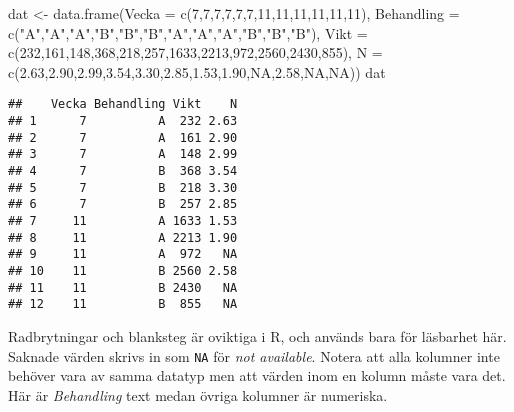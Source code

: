 \documentclass[
]{book}
\newenvironment{Shaded}{\begin{snugshade}}{\end{snugshade}}
\newcommand{\AttributeTok}[1]{\textcolor[rgb]{0.77,0.63,0.00}{#1}}
\newcommand{\ConstantTok}[1]{\textcolor[rgb]{0.00,0.00,0.00}{#1}}
\newcommand{\DecValTok}[1]{\textcolor[rgb]{0.00,0.00,0.81}{#1}}
\newcommand{\FloatTok}[1]{\textcolor[rgb]{0.00,0.00,0.81}{#1}}
\newcommand{\FunctionTok}[1]{\textcolor[rgb]{0.00,0.00,0.00}{#1}}
\newcommand{\NormalTok}[1]{#1}
\newcommand{\OtherTok}[1]{\textcolor[rgb]{0.56,0.35,0.01}{#1}}
\newcommand{\StringTok}[1]{\textcolor[rgb]{0.31,0.60,0.02}{#1}}
\theoremstyle{definition}
\theoremstyle{definition}
\theoremstyle{definition}
\theoremstyle{definition}
\theoremstyle{remark}
\begin{document}
\begin{Shaded}
\begin{Highlighting}[]
\NormalTok{dat }\OtherTok{\textless{}{-}} \FunctionTok{data.frame}\NormalTok{(}\AttributeTok{Vecka =} \FunctionTok{c}\NormalTok{(}\DecValTok{7}\NormalTok{,}\DecValTok{7}\NormalTok{,}\DecValTok{7}\NormalTok{,}\DecValTok{7}\NormalTok{,}\DecValTok{7}\NormalTok{,}\DecValTok{7}\NormalTok{,}\DecValTok{11}\NormalTok{,}\DecValTok{11}\NormalTok{,}\DecValTok{11}\NormalTok{,}\DecValTok{11}\NormalTok{,}\DecValTok{11}\NormalTok{,}\DecValTok{11}\NormalTok{),}
                  \AttributeTok{Behandling =} \FunctionTok{c}\NormalTok{(}\StringTok{"A"}\NormalTok{,}\StringTok{"A"}\NormalTok{,}\StringTok{"A"}\NormalTok{,}\StringTok{"B"}\NormalTok{,}\StringTok{"B"}\NormalTok{,}\StringTok{"B"}\NormalTok{,}\StringTok{"A"}\NormalTok{,}\StringTok{"A"}\NormalTok{,}\StringTok{"A"}\NormalTok{,}\StringTok{"B"}\NormalTok{,}\StringTok{"B"}\NormalTok{,}\StringTok{"B"}\NormalTok{),}
                  \AttributeTok{Vikt =} \FunctionTok{c}\NormalTok{(}\DecValTok{232}\NormalTok{,}\DecValTok{161}\NormalTok{,}\DecValTok{148}\NormalTok{,}\DecValTok{368}\NormalTok{,}\DecValTok{218}\NormalTok{,}\DecValTok{257}\NormalTok{,}\DecValTok{1633}\NormalTok{,}\DecValTok{2213}\NormalTok{,}\DecValTok{972}\NormalTok{,}\DecValTok{2560}\NormalTok{,}\DecValTok{2430}\NormalTok{,}\DecValTok{855}\NormalTok{),}
                  \AttributeTok{N =} \FunctionTok{c}\NormalTok{(}\FloatTok{2.63}\NormalTok{,}\FloatTok{2.90}\NormalTok{,}\FloatTok{2.99}\NormalTok{,}\FloatTok{3.54}\NormalTok{,}\FloatTok{3.30}\NormalTok{,}\FloatTok{2.85}\NormalTok{,}\FloatTok{1.53}\NormalTok{,}\FloatTok{1.90}\NormalTok{,}\ConstantTok{NA}\NormalTok{,}\FloatTok{2.58}\NormalTok{,}\ConstantTok{NA}\NormalTok{,}\ConstantTok{NA}\NormalTok{))}
\NormalTok{dat}
\end{Highlighting}
\end{Shaded}

\begin{verbatim}
##    Vecka Behandling Vikt    N
## 1      7          A  232 2.63
## 2      7          A  161 2.90
## 3      7          A  148 2.99
## 4      7          B  368 3.54
## 5      7          B  218 3.30
## 6      7          B  257 2.85
## 7     11          A 1633 1.53
## 8     11          A 2213 1.90
## 9     11          A  972   NA
## 10    11          B 2560 2.58
## 11    11          B 2430   NA
## 12    11          B  855   NA
\end{verbatim}

Radbrytningar och blanksteg är oviktiga i R, och används bara för läsbarhet här. Saknade värden skrivs in som \texttt{NA} för \emph{not available}. Notera att alla kolumner inte behöver vara av samma datatyp men att värden inom en kolumn måste vara det. Här är \emph{Behandling} text medan övriga kolumner är numeriska.
\end{document}
